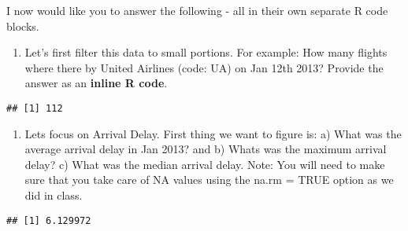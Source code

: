 \documentclass[]{article}
\newenvironment{Shaded}{\begin{snugshade}}{\end{snugshade}}
\newcommand{\KeywordTok}[1]{\textcolor[rgb]{0.13,0.29,0.53}{\textbf{#1}}}
\newcommand{\DataTypeTok}[1]{\textcolor[rgb]{0.13,0.29,0.53}{#1}}
\newcommand{\DecValTok}[1]{\textcolor[rgb]{0.00,0.00,0.81}{#1}}
\newcommand{\StringTok}[1]{\textcolor[rgb]{0.31,0.60,0.02}{#1}}
\newcommand{\CommentTok}[1]{\textcolor[rgb]{0.56,0.35,0.01}{\textit{#1}}}
\newcommand{\OtherTok}[1]{\textcolor[rgb]{0.56,0.35,0.01}{#1}}
\newcommand{\OperatorTok}[1]{\textcolor[rgb]{0.81,0.36,0.00}{\textbf{#1}}}
\newcommand{\NormalTok}[1]{#1}
\providecommand{\tightlist}{%
  \setlength{\itemsep}{0pt}\setlength{\parskip}{0pt}}
\begin{document}
I now would like you to answer the following - all in their own separate
R code blocks.

\begin{enumerate}
\def\labelenumi{\arabic{enumi}.}
\tightlist
\item
  Let's first filter this data to small portions. For example: How many
  flights where there by United Airlines (code: UA) on Jan 12th 2013?
  Provide the answer as an \textbf{inline R code}.
\end{enumerate}

\begin{Shaded}
\end{Shaded}

\begin{verbatim}
## [1] 112
\end{verbatim}

\begin{enumerate}
\def\labelenumi{\arabic{enumi}.}
\setcounter{enumi}{1}
\tightlist
\item
  Lets focus on Arrival Delay. First thing we want to figure is: a) What
  was the average arrival delay in Jan 2013? and b) Whats was the
  maximum arrival delay? c) What was the median arrival delay. Note: You
  will need to make sure that you take care of NA values using the na.rm
  = TRUE option as we did in class.
\end{enumerate}

\begin{Shaded}
\end{Shaded}

\begin{verbatim}
## [1] 6.129972
\end{verbatim}

\begin{Shaded}
\end{Shaded}
\end{document}
